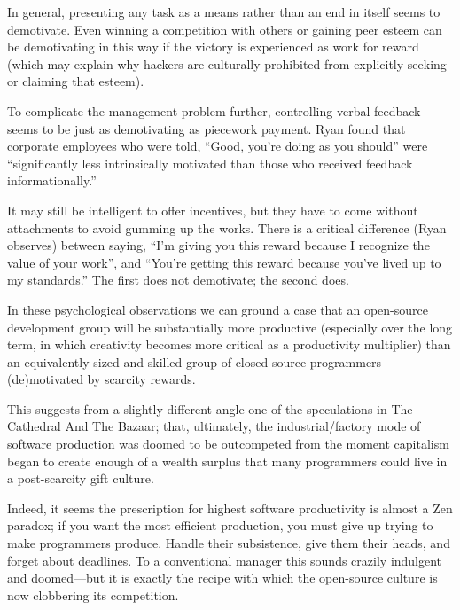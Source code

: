 In general, presenting any task as a means rather than an end in itself seems to
demotivate.  Even winning a competition with others or gaining peer esteem can
be demotivating in this way if the victory is experienced as work for reward
(which may explain why hackers are culturally prohibited from explicitly seeking
or claiming that esteem).

To complicate the management problem further, controlling verbal feedback seems
to be just as demotivating as piecework payment.  Ryan found that corporate
employees who were told, ``Good, you're doing as you should'' were
``significantly less intrinsically motivated than those who received feedback
informationally.''

It may still be intelligent to offer incentives, but they have to come without
attachments to avoid gumming up the works.  There is a critical difference (Ryan
observes) between saying, ``I'm giving you this reward because I recognize the
value of your work'', and ``You're getting this reward because you've lived up
to my standards.'' The first does not demotivate; the second does.

In these psychological observations we can ground a case that an open-source
development group will be substantially more productive (especially over the
long term, in which creativity becomes more critical as a productivity
multiplier) than an equivalently sized and skilled group of closed-source
programmers (de)motivated by scarcity rewards.

This suggests from a slightly different angle one of the speculations in The
Cathedral And The Bazaar; that, ultimately, the industrial/factory mode of
software production was doomed to be outcompeted from the moment capitalism
began to create enough of a wealth surplus that many programmers could live in a
post-scarcity gift culture.

Indeed, it seems the prescription for highest software productivity is almost a
Zen paradox; if you want the most efficient production, you must give up trying
to make programmers produce.  Handle their subsistence, give them their heads,
and forget about deadlines.  To a conventional manager this sounds crazily
indulgent and doomed—but it is exactly the recipe with which the open-source
culture is now clobbering its competition.
